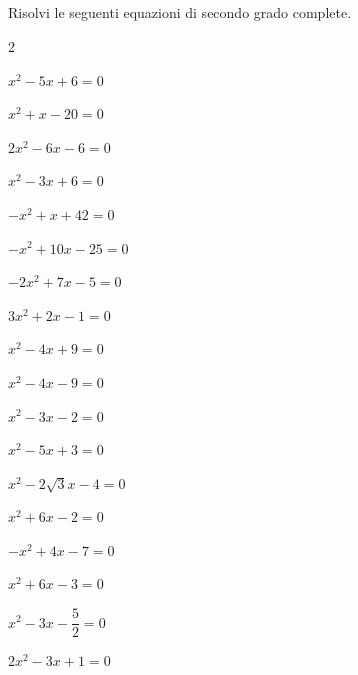 \subsection*{}

\begin{esercizio}[*]
\label{ese:3.12}
Risolvi le seguenti equazioni di secondo grado complete.
\begin{htmulticols}{2}
\begin{enumeratea}
\item \(x^{2}-5 x + 6=0\)
\item \(x^{2} + x-20=0\)
\item \(2 x^{2}-6 x-6=0\)
\item \(x^{2}-3 x + 6=0\)
\sol{\emptyset}
\item \(- x^{2} + x + 42=0\)
\item \(- x^{2} + 10 x-25=0\)
\item \(- 2 x^{2} + 7 x-5=0\)
\item \(3 x^{2} + 2 x-1=0\)
\item \(x^{2}-4 x + 9 = 0\)
\sol{\emptyset}
\item \(x^{2}-4 x-9 = 0\)
\item \(x^{2}-3 x-2=0\)
\item \(x^{2}-5 x + 3 = 0\)
\item \(x^{2}-2 \sqrt{3} x-4=0\)
\item \(x^{2} + 6 x-2 = 0\)
\item \(- x^{2} + 4 x-7=0\)
\sol{\emptyset}
\item \(x^{2} + 6 x-3 = 0\)
\item \(x^{2}-3 x-\dfrac{5}{2} = 0\)
\item \(2 x^{2}-3 x + 1 = 0\)

\end{enumeratea}
\end{htmulticols}
\end{esercizio}
